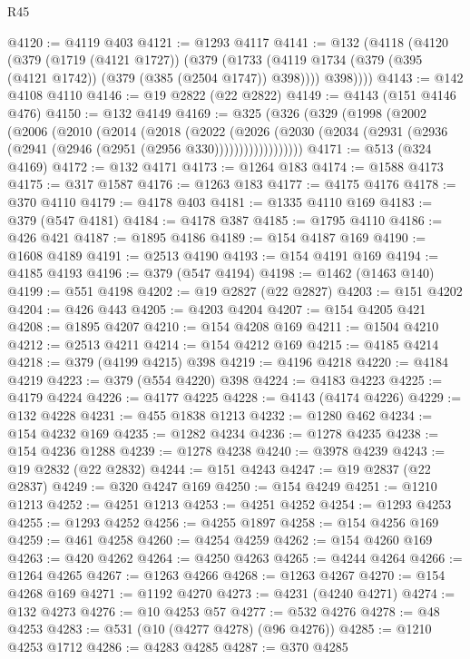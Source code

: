 \begin{lexlean}{R45}
\begin{coremodule}
@4120 := @4119 @403
@4121 := @1293 @4117
@4141 := @132
    (@4118
      (@4120
        (@379
          (@1719 (@4121 @1727))
          (@379
            (@1733 (@4119 @1734 (@379 (@395 (@4121 @1742)) (@379 (@385 (@2504 @1747)) @398))))
            @398))))
@4143 := @142 @4108 @4110
@4146 := @19 @2822 (@22 @2822)
@4149 := @4143 (@151 @4146 @476)
@4150 := @132 @4149
@4169 := @325
    (@326
      (@329
        (@1998
          (@2002
            (@2006
              (@2010
                (@2014
                  (@2018
                    (@2022
                      (@2026
                        (@2030
                          (@2034 (@2931 (@2936 (@2941 (@2946 (@2951 (@2956 @330))))))))))))))))))
@4171 := @513 (@324 @4169)
@4172 := @132 @4171
@4173 := @1264 @183
@4174 := @1588 @4173
@4175 := @317 @1587
@4176 := @1263 @183
@4177 := @4175 @4176
@4178 := @370 @4110
@4179 := @4178 @403
@4181 := @1335 @4110 @169
@4183 := @379 (@547 @4181)
@4184 := @4178 @387
@4185 := @1795 @4110
@4186 := @426 @421
@4187 := @1895 @4186
@4189 := @154 @4187 @169
@4190 := @1608 @4189
@4191 := @2513 @4190
@4193 := @154 @4191 @169
@4194 := @4185 @4193
@4196 := @379 (@547 @4194)
@4198 := @1462 (@1463 @140)
@4199 := @551 @4198
@4202 := @19 @2827 (@22 @2827)
@4203 := @151 @4202
@4204 := @426 @443
@4205 := @4203 @4204
@4207 := @154 @4205 @421
@4208 := @1895 @4207
@4210 := @154 @4208 @169
@4211 := @1504 @4210
@4212 := @2513 @4211
@4214 := @154 @4212 @169
@4215 := @4185 @4214
@4218 := @379 (@4199 @4215) @398
@4219 := @4196 @4218
@4220 := @4184 @4219
@4223 := @379 (@554 @4220) @398
@4224 := @4183 @4223
@4225 := @4179 @4224
@4226 := @4177 @4225
@4228 := @4143 (@4174 @4226)
@4229 := @132 @4228
@4231 := @455 @1838 @1213
@4232 := @1280 @462
@4234 := @154 @4232 @169
@4235 := @1282 @4234
@4236 := @1278 @4235
@4238 := @154 @4236 @1288
@4239 := @1278 @4238
@4240 := @3978 @4239
@4243 := @19 @2832 (@22 @2832)
@4244 := @151 @4243
@4247 := @19 @2837 (@22 @2837)
@4249 := @320 @4247 @169
@4250 := @154 @4249
@4251 := @1210 @1213
@4252 := @4251 @1213
@4253 := @4251 @4252
@4254 := @1293 @4253
@4255 := @1293 @4252
@4256 := @4255 @1897
@4258 := @154 @4256 @169
@4259 := @461 @4258
@4260 := @4254 @4259
@4262 := @154 @4260 @169
@4263 := @420 @4262
@4264 := @4250 @4263
@4265 := @4244 @4264
@4266 := @1264 @4265
@4267 := @1263 @4266
@4268 := @1263 @4267
@4270 := @154 @4268 @169
@4271 := @1192 @4270
@4273 := @4231 (@4240 @4271)
@4274 := @132 @4273
@4276 := @10 @4253 @57
@4277 := @532 @4276
@4278 := @48 @4253
@4283 := @531 (@10 (@4277 @4278) (@96 @4276))
@4285 := @1210 @4253 @1712
@4286 := @4283 @4285
@4287 := @370 @4285

\end{coremodule}
\end{lexlean}
